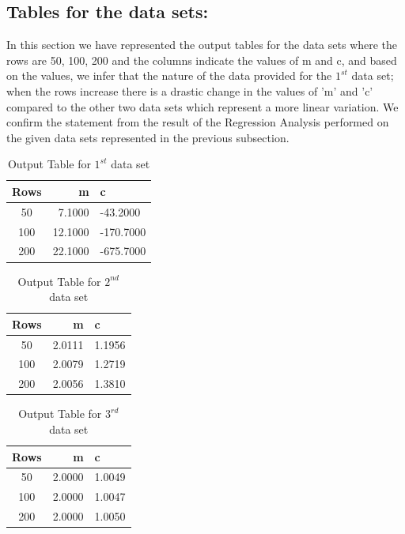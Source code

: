 \documentclass[12pt,a4paper]{article}
\begin{document}
\subsection{Tables for the data sets:}
In this section we have represented the output tables for the data sets where the rows are 50, 100, 200 and the columns indicate the values of m and c, and based on the values, we infer that the nature of the data provided for the $1^{st}$ data set; when the rows increase there is a drastic change in the values of 'm' and 'c' compared to the other two data sets which represent a more linear variation. We confirm the statement from the result of the Regression Analysis performed on the given data sets represented in the previous subsection. 
\begin{table}[h]
	\begin{center}
\begin{tabular}{|c|r|l|}
\hline
Rows & m & c \\
\hline
50 & 7.1000 & -43.2000 \\
100 & 12.1000 & -170.7000 \\
200 & 22.1000 & -675.7000 \\
\hline
\end{tabular}
	\caption{Output Table for $1^{st}$ data set}
	\label{tab:progs}
	\end{center}
\end{table}
\begin{table}[h]
	\begin{center}
\begin{tabular}{|c|r|l|}
\hline
Rows & m & c \\
\hline
50 & 2.0111 & 1.1956 \\
100 & 2.0079 & 1.2719 \\
200 & 2.0056 & 1.3810 \\
\hline
\end{tabular}
	\caption{Output Table for $2^{nd}$ data set}
	\label{tab:progs}
	\end{center}
\end{table}
\clearpage
\begin{table}[h]
	\begin{center}
\begin{tabular}{|c|r|l|}
\hline
Rows & m & c \\
\hline
50 & 2.0000 & 1.0049 \\
100 & 2.0000 & 1.0047 \\
200 & 2.0000 & 1.0050 \\
\hline
\end{tabular}
	\caption{Output Table for $3^{rd}$ data set}
	\label{tab:progs}
	\end{center}
\end{table}
\end{document}
